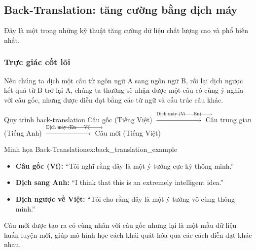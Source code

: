 \subsection{Back-Translation: tăng cường bằng dịch máy}
\label{ssec:back_translation}
Đây là một trong những kỹ thuật tăng cường dữ liệu chất lượng cao và phổ biến nhất.

\subsubsection{Trực giác cốt lõi}
Nếu chúng ta dịch một câu từ ngôn ngữ A sang ngôn ngữ B, rồi lại dịch ngược kết quả từ B trở lại A, chúng ta thường sẽ nhận được một câu có cùng ý nghĩa với câu gốc, nhưng được diễn đạt bằng các từ ngữ và cấu trúc câu khác.

\begin{checklist}{Quy trình back-translation}
Câu gốc (Tiếng Việt) $\xrightarrow{\text{Dịch máy (Vi } \rightarrow \text{ En)}}$ Câu trung gian (Tiếng Anh) $\xrightarrow{\text{Dịch máy (En } \rightarrow \text{ Vi)}}$ Câu mới (Tiếng Việt)
\end{checklist}

\begin{example}{Minh họa Back-Translation}{ex:back_translation_example}
    \begin{itemize}
        \item \textbf{Câu gốc (Vi):} “Tôi nghĩ rằng đây là một ý tưởng cực kỳ thông minh.”
        \item \textbf{Dịch sang Anh:} “I think that this is an extremely intelligent idea.”
        \item \textbf{Dịch ngược về Việt:} “Tôi cho rằng đây là một ý tưởng vô cùng thông minh.”
    \end{itemize}
    Câu mới được tạo ra có cùng nhãn với câu gốc nhưng lại là một mẫu dữ liệu huấn luyện mới, giúp mô hình học cách khái quát hóa qua các cách diễn đạt khác nhau.
\end{example}

